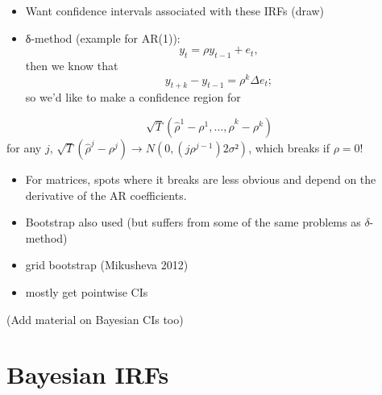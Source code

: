 \begin{itemize}
\item Want confidence intervals associated with these IRFs (draw)
\item δ-method (example for AR(1)): 
  \[y_t = ρ y_{t-1} + e_t,\]
  then we know that 
  \[  y_{t+k} - y_{t-1} = ρ^k Δe_t;\] 
  so we'd like to make a confidence region for
\end{itemize}
\[\sqrt{T} (\hat ρ^1 - ρ^1,…,\hat ρ^k - ρ^k)\]
for any $j$, $\sqrt{T} (\hat ρ^j - ρ^j) → N(0, (j ρ^{j-1}) 2 σ²)$,
which breaks if $ρ = 0$!

\begin{itemize}
\item For matrices, spots where it breaks are less obvious and depend
  on the derivative of the AR coefficients.
\item Bootstrap also used (but suffers from some of the same problems
  as $δ$-method)
\item grid bootstrap (Mikusheva 2012)
\item mostly get pointwise CIs
\end{itemize}

(Add material on Bayesian CIs too)

\section{Bayesian IRFs}

